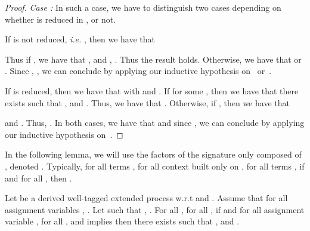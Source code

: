 \begin{proof}
\smallskip{}

 \emph{Case :} In such a case,
 we have to distinguish two cases depending on whether  is reduced in
 , or not.

 If  is not reduced, \emph{i.e.} , then we have that
  
Thus if , we have that ,  and , . Thus the result
 holds. Otherwise, we have that  or . Since , , we
 can conclude by applying our inductive hypothesis on~ or~.

 If  is reduced, then we have that  with  and . If  for some , then
 we have that there exists  such that ,
  and . Thus, we have that 
.
Otherwise, if , then we
have that 

 and
 . Thus, 
 . In
 both cases, we have that  and since , we can conclude by
 applying our inductive hypothesis on~.
\end{proof}


\newcommand{\fctpair}{\fct_{\langle\ \rangle}}

In the following lemma, we will use the factors of the signature only composed of , denoted . Typically, for all terms , for all context built only on , for all terms , if  and for all ,  then .




\begin{lemma}
  \label{lem:FlawedColor and frame element direct element 2}
  Let  be a derived well-tagged extended process w.r.t  and . Assume that for all assignment variables , . Let  such that , . For all , for all , if  and for all assignment variable , for all ,  and  implies  then there exists  such that ,  and .
\end{lemma}

